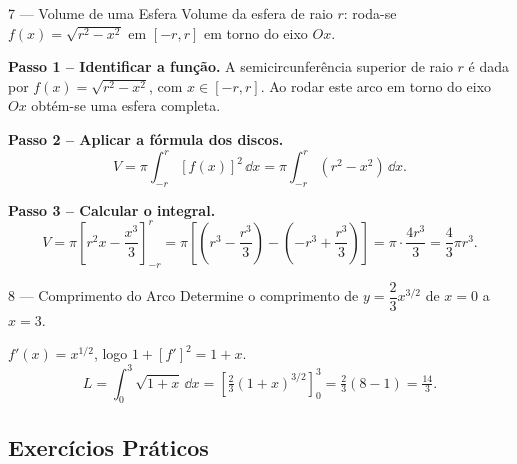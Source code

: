 \begin{exbox}{7 --- Volume de uma Esfera}
  Volume da esfera de raio $r$: roda-se $f(x)=\sqrt{r^2-x^2}$ em
  $[-r,r]$ em torno do eixo $Ox$.
\end{exbox}
\begin{solbox}
  \textbf{Passo 1 -- Identificar a função.} A semicircunferência superior de
  raio $r$ é dada por $f(x)=\sqrt{r^2-x^2}$, com $x\in[-r,r]$. Ao rodar
  este arco em torno do eixo $Ox$ obtém-se uma esfera completa.

  \textbf{Passo 2 -- Aplicar a fórmula dos discos.}
  \[
    V = \pi\int_{-r}^r [f(x)]^2\,\dd x = \pi\int_{-r}^r (r^2-x^2)\,\dd x.
  \]

  \textbf{Passo 3 -- Calcular o integral.}
  \[
    V = \pi\left[r^2 x - \frac{x^3}{3}\right]_{-r}^r
      = \pi\left[\left(r^3-\frac{r^3}{3}\right)-\left(-r^3+\frac{r^3}{3}\right)\right]
      = \pi\cdot\frac{4r^3}{3} = \frac{4}{3}\pi r^3.
  \]
\end{solbox}

\begin{exbox}{8 --- Comprimento do Arco}
  Determine o comprimento de $y=\dfrac{2}{3}x^{3/2}$ de $x=0$ a $x=3$.
\end{exbox}
\begin{solbox}
  $f'(x)=x^{1/2}$, logo $1+[f']^2=1+x$.
  \[
    L = \int_0^3\sqrt{1+x}\,\dd x = \left[\tfrac{2}{3}(1+x)^{3/2}\right]_0^3
      = \tfrac{2}{3}(8-1) = \tfrac{14}{3}.
  \]
\end{solbox}

\subsection{Exercícios Práticos}

